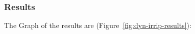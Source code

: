 \documentclass[11pt,a4paper]{article}
\begin{document}
\subsubsection{Results}

The Graph of the results are (Figure~\ref{fig:dyn-irrip-results}):

\end{document}
